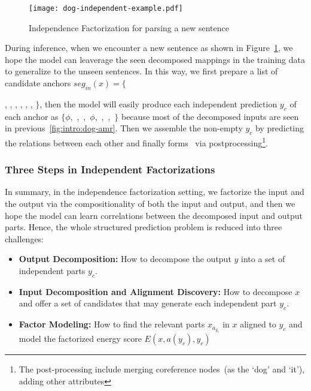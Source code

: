 \begin{figure}[!th]
\centering
\texttt{[image: dog-independent-example.pdf]}
\caption{\label{fig:intro:independent-example}Independence
  Factorization for parsing a new sentence }
\end{figure}

During inference, when we encounter a new sentence as shown in
Figure~\ref{fig:intro:independent-example}, we hope the model can
leaverage the seen decomposed mappings in the training data to
generalize to the unseen sentences. In this way, we first prepare a
list of candidate anchors $seg_{in}(x)=\{${,
  , , , ,
  , $\}$, then the model will easily produce
  each independent prediction $y_{c}$ of each anchor as
  $\{\phi$,~,~,~$\phi$,~,~,~$\}$
  because most of the decomposed inputs are seen in
  previous~\autoref{fig:intro:dog-amr}. Then we assemble the non-empty
  $y_{c}$ by predicting the relations between each other and finally
  forms \OUT~via postprocessing\footnote{The post-processing include
    merging coreference nodes~(as the `dog' and `it'), adding other
    attributes}.

\subsubsection{Three Steps in Independent Factorizations}
\label{sssec:intro:steps-inductive-bias}
In summary, in the independence factorization setting, we factorize
the input and the output via the compositionality of both the input
and output, and then we hope the model can learn correlations between
the decomposed input and output parts. Hence, the whole structured
prediction problem is reduced into three challenges:

\begin{itemize}
\item \textbf{Output Decomposition:} How to decompose the output $y$
  into a set of independent parts $y_{c}$.

\item \textbf{Input Decomposition and Alignment Discovery:} How to decompose $x$ and offer a
  set of candidates that may generate each independent part $y_{c}$.
\item \textbf{Factor Modeling:} How to find the relevant parts
  $x_{a_{y_{c}}}$ in $x$ aligned to ${y_{c}}$ and model the factorized
  energy score $E(x, a(y_{c}), y_{c})$
\end{itemize}

}
